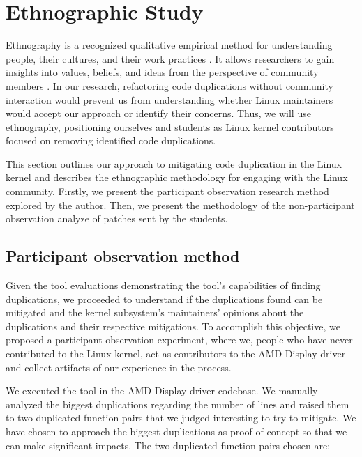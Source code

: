 \section{Ethnographic Study}

\label{sec:meteth}

Ethnography is a recognized qualitative empirical method for understanding people, 
their cultures, and their work practices \citep{bookethno}. It allows researchers 
to gain insights into values, beliefs, and ideas from the perspective of community 
members \citep{ethnosoft}. In our research, refactoring code duplications without 
community interaction would prevent us from understanding whether Linux maintainers 
would accept our approach or identify their concerns. Thus, we will use ethnography, 
positioning ourselves and students as Linux kernel contributors focused on removing 
identified  code duplications.

This section outlines our approach to mitigating code duplication in the Linux kernel 
and describes the ethnographic methodology for engaging with the Linux community. 
Firstly, we present the participant observation research method explored by the author. 
Then, we present the methodology of the non-participant observation analyze of patches 
sent by the students.

\subsection{Participant observation method}
\label{subsec:partmethod}

Given the tool evaluations demonstrating the tool's capabilities of finding duplications, 
we proceeded to understand if the duplications found can be mitigated and the kernel 
subsystem's maintainers' opinions about the duplications and their respective mitigations. 
To accomplish this objective, we proposed a participant-observation experiment, 
where we, people who have never contributed to the Linux kernel, act as contributors to 
the AMD Display driver and collect artifacts of our experience in the process.

We executed the tool in the AMD Display driver codebase. 
We manually analyzed the biggest duplications regarding the number of lines and raised them 
to two duplicated function pairs that we judged interesting to try to mitigate. We have 
chosen to approach the biggest duplications as proof of concept so that we can make 
significant impacts. The two duplicated function pairs chosen are:

